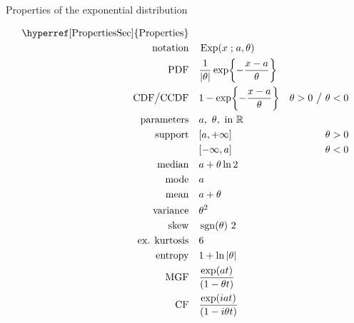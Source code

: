 

\begin{table*}[t!]
\caption[Exponential distribution -- Properties]{Properties of the exponential distribution}
\begin{align*}
\text{\hyperref[PropertiesSec]{Properties}}  \quad& \\
\text{notation} \quad & \op{Exp}(x\given a,\theta)					\checked
\\
\text{PDF}\quad &    \frac{1}{|\theta|} \exp\Left\{-\frac{x-a}{\theta}\Right\} 	\checked
\\
\text{CDF}\big  / \text{CCDF}  \quad  &   1- \exp\Left\{-\frac{x-a}{\theta}\Right\} & \theta>0 \ \big{/} \  \theta<0
\checked
\\
\text{parameters}\quad &   a,\ \theta, \text{ in } \Real 				\checked
\\
\text{support} \quad &   [ a, +\infty]      & \theta>0					\checked
\\
				&   [-\infty,  a]     & \theta <0					\checked
\\
\text{median} \quad  &  a + \theta \ln 2							\checked
\\
\text{mode} \quad  & a										\checked
\\
\text{mean} \quad  &  a+ \theta									\checked						
\\
\text{variance} \quad  & \theta^2								\checked
\\
\text{skew} \quad  &  \op{sgn}(\theta)\ 2										\checked
\\
\text{ex. kurtosis} \quad  &  6										\checked
\\
\text{entropy} \quad  & 1 + \ln |\theta|							\checked
\\
\text{MGF} \quad  & \frac{\exp(at) }{ \Left(1- \theta t\Right)}				\checked
\\
\text{CF} \quad  & \frac{\exp(iat) }{ \Left(1- i \theta t\Right)}				\checked
\end{align*}
\end{table*}
